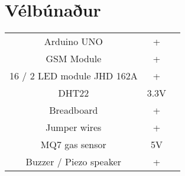 \section{Vélbúnaður}
\begin{center}
\begin{tabular}{ |c|c|c| } 
 \hline 
 Arduino UNO & + &\\ 
 GSM Module & + & \\ 
 16 / 2 LED module JHD 162A & + & \\
 DHT22 & 3.3V & \\
 Breadboard & + & \\
 Jumper wires & + & \\
 MQ7 gas sensor & 5V & \\
 Buzzer / Piezo speaker & +  & \\
 \hline
\end{tabular}
\end{center}